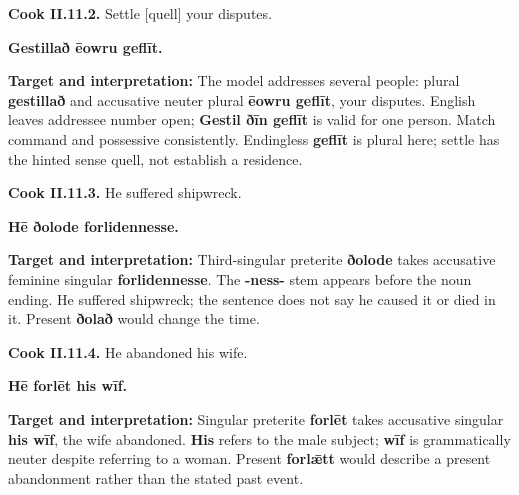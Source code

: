 \par\begin{minipage}{\linewidth}\raggedright
\textbf{Cook II.11.2.} Settle [quell] your disputes.

\textbf{Gestillað ēowru geflīt.}

\textbf{Target and interpretation:} The model addresses several people: plural \textbf{gestillað} and accusative neuter plural \textbf{ēowru geflīt}, your disputes. English leaves addressee number open; \textbf{Gestil ðīn geflīt} is valid for one person. Match command and possessive consistently. Endingless \textbf{geflīt} is plural here; settle has the hinted sense quell, not establish a residence.

\end{minipage}\par\addvspace{4pt}

\par\begin{minipage}{\linewidth}\raggedright
\textbf{Cook II.11.3.} He suffered shipwreck.

\textbf{Hē ðolode forlidennesse.}

\textbf{Target and interpretation:} Third-singular preterite \textbf{ðolode} takes accusative feminine singular \textbf{forlidennesse}. The \textbf{-ness-} stem appears before the noun ending. He suffered shipwreck; the sentence does not say he caused it or died in it. Present \textbf{ðolað} would change the time.

\end{minipage}\par\addvspace{4pt}

\par\begin{minipage}{\linewidth}\raggedright
\textbf{Cook II.11.4.} He abandoned his wife.

\textbf{Hē forlēt his wīf.}

\textbf{Target and interpretation:} Singular preterite \textbf{forlēt} takes accusative singular \textbf{his wīf}, the wife abandoned. \textbf{His} refers to the male subject; \textbf{wīf} is grammatically neuter despite referring to a woman. Present \textbf{forlǣtt} would describe a present abandonment rather than the stated past event.

\end{minipage}\par\addvspace{4pt}

